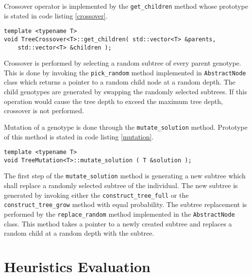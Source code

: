 Crossover operator is implemented by the \texttt{get\_children} method whose prototype is stated in code listing \ref{crossover}.
\begin{lstlisting}[frame=none, label={crossover}, caption={Prototype of the \texttt{get\_children} method which performs crossover.}, captionpos=b]
template <typename T>
void TreeCrossover<T>::get_children( std::vector<T> &parents, 
	std::vector<T> &children );
\end{lstlisting}
Crossover is performed by selecting a random subtree of every parent genotype.
This is done by invoking the \texttt{pick\_random} method implemented in \texttt{AbstractNode} class which returns a pointer to a random child node at a random depth.
The child genotypes are generated by swapping the randomly selected subtrees.
If this operation would cause the tree depth to exceed the maximum tree depth, crossover is not performed.

Mutation of a genotype is done through the \texttt{mutate\_solution} method.
Prototype of this method is stated in code listing \ref{mutation}.
\begin{lstlisting}[frame=none, label={mutation}, caption={Prototype of the \texttt{mutate\_solution} method.}, captionpos=b]
template <typename T>
void TreeMutation<T>::mutate_solution ( T &solution );
\end{lstlisting}
The first step of the \texttt{mutate\_solution} method is generating a new subtree which shall replace a randomly selected subtree of the individual.
The new subtree is generated by invoking either the \texttt{construct\_tree\_full} or the \texttt{construct\_tree\_grow} method with equal probability.
The subtree replacement is performed by the \texttt{replace\_random} method implemented in the \texttt{AbstractNode} class.
This method takes a pointer to a newly created subtree and replaces a random child at a random depth with the subtree.

\section{Heuristics Evaluation}
